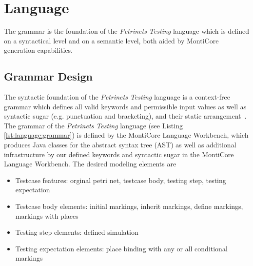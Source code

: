 
\section{Language}\label{sec:language}

The grammar is the foundation of the \emph{Petrinets Testing} language which is defined on a syntactical level and on a semantic level, both aided by MontiCore generation capabilities.

\subsection{Grammar Design}

The syntactic foundation of the \emph{Petrinets Testing} language is a context-free grammar which defines all valid keywords and permissible input values as well as syntactic sugar (e.g. punctuation and bracketing), and their static arrangement~\cite{rumpe2017monticore}. The grammar of the \emph{Petrinets Testing} language (see Listing \ref{lst:language:grammar}) is defined by the MontiCore Language Workbench, which produces Java classes for the abstract syntax tree (AST) as well as additional infrastructure by our defined keywords and syntactic sugar in the MontiCore Language Workbench. The desired modeling elements are

\begin{itemize}
    \item Testcase features: orginal petri net, testcase body, testing step, testing expectation
    \item Testcase body elements: initial markings, inherit markings, define markings, markings with places
    \item Testing step elements: defined simulation
    \item Testing expectation elements: place binding with any or all conditional markings
\end{itemize}

